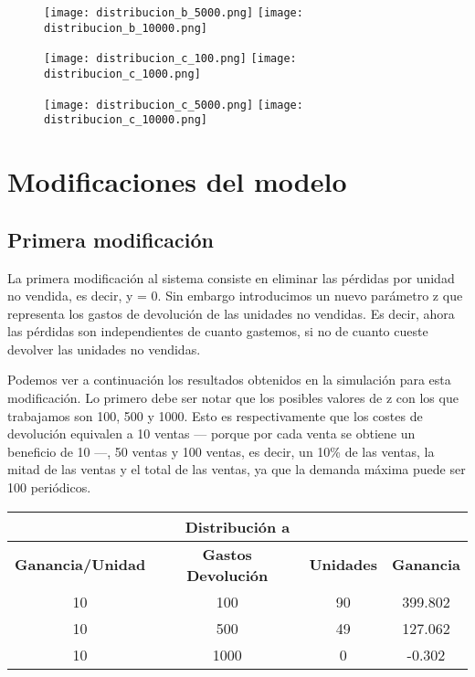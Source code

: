 \begin{figure}[H]
	\centering
	\texttt{[image: distribucion\_b\_5000.png]}
	\texttt{[image: distribucion\_b\_10000.png]}
\end{figure}

\begin{figure}[H]
	\centering
	\texttt{[image: distribucion\_c\_100.png]}
	\texttt{[image: distribucion\_c\_1000.png]}
\end{figure}

\begin{figure}[H]
	\centering
	\texttt{[image: distribucion\_c\_5000.png]}
	\texttt{[image: distribucion\_c\_10000.png]}
\end{figure}



\section{Modificaciones del modelo}

\subsection{Primera modificación}
La primera modificación al sistema consiste en eliminar las pérdidas por unidad no vendida, es decir, y = 0. Sin embargo introducimos un nuevo parámetro z que representa los gastos de devolución de las unidades no vendidas. Es decir, ahora las pérdidas son independientes de cuanto gastemos, si no de cuanto cueste devolver las unidades no vendidas.

Podemos ver a continuación los resultados obtenidos en la simulación para esta modificación. Lo primero debe ser notar que los posibles valores de z con los que trabajamos son 100, 500 y 1000. Esto es respectivamente que los costes de devolución equivalen a 10 ventas --- porque por cada venta se obtiene un beneficio de 10 ---, 50 ventas y 100 ventas, es decir, un 10\% de las ventas, la mitad de las ventas y el total de las ventas, ya que la demanda máxima puede ser 100 periódicos.


\begin{table}[H]
\centering
\begin{tabular}{|c|c|c|c|}
\hline
\multicolumn{4}{|c|}{\textbf{Distribución a}} \\ \hline
\textbf{Ganancia/Unidad} & \textbf{Gastos Devolución} & \textbf{Unidades} & \textbf{Ganancia} \\ \hline
10 & 100 & 90 & 399.802 \\
10 & 500 & 49 & 127.062 \\
10 & 1000 & 0 & -0.302 \\ \hline
\end{tabular}
\end{table}

